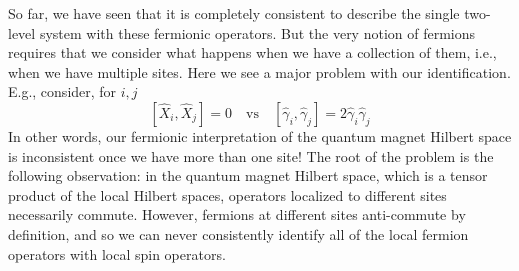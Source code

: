 So far, we have seen that it is completely consistent to describe the single two-level system with these fermionic operators. But the very notion of fermions requires that we consider what happens when we have a collection of them, i.e., when we have multiple sites. Here we see a major problem with our identification. E.g., consider, for $i,j$
\[ \left[ \hat{X}_i,\hat{X}_j \right] =0\quad \mathrm{vs}\quad \left[ \hat{\gamma}_i,\hat{\gamma}_j \right] =2\hat{\gamma}_i\hat{\gamma}_j\]
In other words, our fermionic interpretation of the quantum magnet Hilbert space is inconsistent once we have more than one site! The root of the problem is the following observation: in the quantum magnet Hilbert space, which is a tensor product of the local Hilbert spaces, operators localized to different sites necessarily commute. However, fermions at different sites anti-commute by definition, and so we can never consistently identify all of the local fermion operators with local spin operators.

